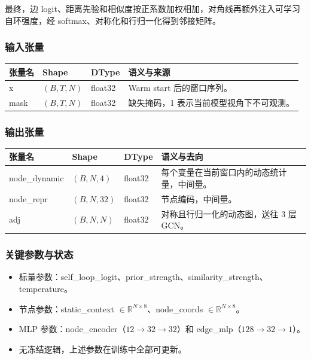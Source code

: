 \documentclass[11pt,a4paper]{ctexart}
\newcommand{\code}[1]{{\ttfamily\small #1}}
\begin{document}
最终，边 logit、距离先验和相似度按正系数加权相加，对角线再额外注入可学习自环强度，经 softmax、对称化和行归一化得到邻接矩阵。

\subsubsection{输入张量}

\begin{tabularx}{\textwidth}{@{}L{3.6cm}L{2.3cm}L{1.5cm}Y@{}}
\toprule
张量名 & Shape & DType & 语义与来源 \\
\midrule
\code{x} & $(B,T,N)$ & \code{float32} & Warm start 后的窗口序列。 \\
\code{mask} & $(B,T,N)$ & \code{float32} & 缺失掩码，1 表示当前模型视角下不可观测。 \\
\bottomrule
\end{tabularx}

\subsubsection{输出张量}

\begin{tabularx}{\textwidth}{@{}L{3.6cm}L{2.3cm}L{1.5cm}Y@{}}
\toprule
张量名 & Shape & DType & 语义与去向 \\
\midrule
\code{node\_dynamic} & $(B,N,4)$ & \code{float32} & 每个变量在当前窗口内的动态统计量，中间量。 \\
\code{node\_repr} & $(B,N,32)$ & \code{float32} & 节点编码，中间量。 \\
\code{adj} & $(B,N,N)$ & \code{float32} & 对称且行归一化的动态图，送往 3 层 GCN。 \\
\bottomrule
\end{tabularx}

\subsubsection{关键参数与状态}

\begin{itemize}
  \item 标量参数：\code{self\_loop\_logit}、\code{prior\_strength}、\code{similarity\_strength}、\code{temperature}。
  \item 节点参数：\code{static\_context} $\in \mathbb{R}^{N \times 8}$、\code{node\_coords} $\in \mathbb{R}^{N \times 8}$。
  \item MLP 参数：\code{node\_encoder}（$12 \rightarrow 32 \rightarrow 32$）和 \code{edge\_mlp}（$128 \rightarrow 32 \rightarrow 1$）。
  \item 无冻结逻辑，上述参数在训练中全部可更新。
\end{itemize}
\end{document}
